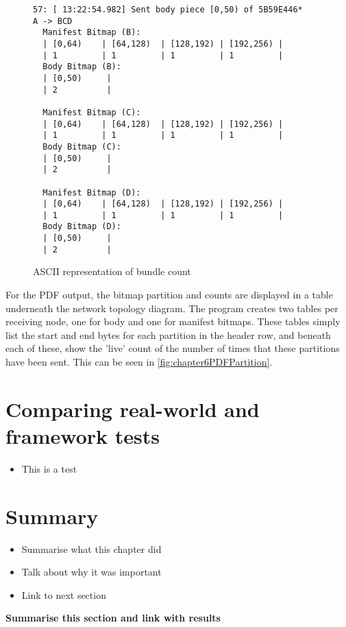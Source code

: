 \begin{figure}
    \begin{centering}
\begin{lstlisting}[basicstyle=\small, frame=single, breaklines]
57: [ 13:22:54.982] Sent body piece [0,50) of 5B59E446*
A -> BCD
  Manifest Bitmap (B):
  | [0,64)    | [64,128)  | [128,192) | [192,256) |
  | 1         | 1         | 1         | 1         |
  Body Bitmap (B):
  | [0,50)     |
  | 2          |
  
  Manifest Bitmap (C):
  | [0,64)    | [64,128)  | [128,192) | [192,256) |
  | 1         | 1         | 1         | 1         |
  Body Bitmap (C):
  | [0,50)     |
  | 2          |
  
  Manifest Bitmap (D):
  | [0,64)    | [64,128)  | [128,192) | [192,256) |
  | 1         | 1         | 1         | 1         |
  Body Bitmap (D):
  | [0,50)     |
  | 2          |
\end{lstlisting}
        \caption{ASCII representation of bundle count}
        \label{fig:chapter6ASCIIPartition}
    \end{centering}
\end{figure}


For the PDF output, the bitmap partition and counts are displayed in a table underneath the network topology diagram.
The program creates two tables per receiving node, one for body and one for manifest bitmaps.
These tables simply list the start and end bytes for each partition in the header row, and beneath each of these, show the 'live' count of the number of times that these partitions have been sent.
This can be seen in \figurename{ \ref{fig:chapter6PDFPartition}}.




\section{Comparing real-world and framework tests}
\begin{itemize}
    \item This is a test
\end{itemize}

\section{Summary}
\begin{itemize}
    \item Summarise what this chapter did
    \item Talk about why it was important
    \item Link to next section
\end{itemize}
\textbf{Summarise this section and link with results}